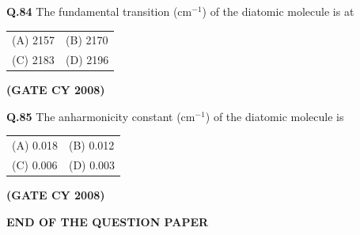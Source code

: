 \documentclass[12pt]{article}
\begin{document}
\begin{enumerate}
\textbf{Q.84} \quad The fundamental transition (cm$^{-1}$) of the diatomic molecule is at

\begin{tabular}{ll}
(A) 2157 & (B) 2170 \\
(C) 2183 & (D) 2196 \\
\end{tabular}   \textbf{(GATE CY 2008)}


\textbf{Q.85} \quad The anharmonicity constant (cm$^{-1}$) of the diatomic molecule is

\begin{tabular}{ll}
(A) 0.018 & (B) 0.012 \\
(C) 0.006 & (D) 0.003 \\
\end{tabular}   \textbf{(GATE CY 2008)}


\begin{center}
\textbf{END OF THE QUESTION PAPER}
\end{center}

\end{enumerate}
\end{document}
